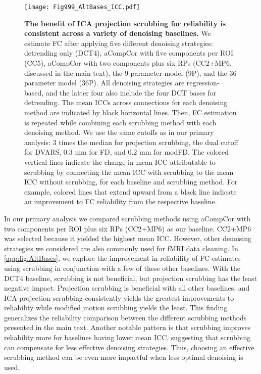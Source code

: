 \documentclass{article}
\begin{document}
\begin{figure}[H]
    \centering
    \texttt{[image: Fig999\_AltBases\_ICC.pdf]}
    \caption{\small \textbf{The benefit of ICA projection scrubbing for reliability is consistent across a variety of denoising baselines.} We estimate FC after applying five different denoising strategies: detrending only (DCT4), aCompCor with five components per ROI (CC5), aCompCor with two components plus six RPs (CC2+MP6, discussed in the main text), the 9 parameter model (9P), and the 36 parameter model (36P). All denoising strategies are regression-based, and the latter four also include the four DCT bases for detrending. The mean ICCs across connections for each denoising method are indicated by black horizontal lines. Then, FC estimation is repeated while combining each scrubbing method with each denoising method. We use the same cutoffs as in our primary analysis: 3 times the median for projection scrubbing, the dual cutoff for DVARS, 0.3 mm for FD, and 0.2 mm for modFD. The colored vertical lines indicate the change in mean ICC attributable to scrubbing by connecting the mean ICC with scrubbing to the mean ICC without scrubbing, for each baseline and scrubbing method. For example, colored lines that extend upward from a black line indicate an improvement to FC reliability from the respective baseline.}
    \label{app:fig:AltBases}
\end{figure}

In our primary analysis we compared scrubbing methods using aCompCor with two components per ROI plus six RPs (CC2+MP6) as our baseline. CC2+MP6 was selected because it yielded the highest mean ICC. However, other denoising strategies we considered are also commonly used for fMRI data cleaning. In \autoref{app:fig:AltBases}, we explore the improvement in reliability of FC estimates using scrubbing in conjunction with a few of these other baselines. With the DCT4 baseline, scrubbing is not beneficial, but projection scrubbing has the least negative impact. Projection scrubbing is beneficial with all other baselines, and ICA projection scrubbing consistently yields the greatest improvements to reliability while modified motion scrubbing yields the least. This finding generalizes the reliability comparison between the different scrubbing methods presented in the main text. Another notable pattern is that scrubbing improves reliability more for baselines having lower mean ICC, suggesting that scrubbing can compensate for less effective denoising strategies. Thus, choosing an effective scrubbing method can be even more impactful when less optimal denoising is used. 
\end{document}
